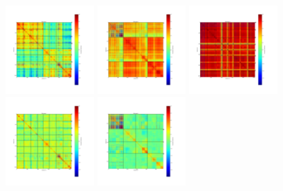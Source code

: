 \begin{figure}[ht] %
\begin{center}
\includegraphics[width=0.3\textwidth]{Figures/DarkTests/corrmat_TOI_array_1_20161211s299.pdf}
\includegraphics[width=0.3\textwidth]{Figures/DarkTests/corrmat_TOI_array_2_20161211s299.pdf}
\includegraphics[width=0.3\textwidth]{Figures/DarkTests/corrmat_TOI_array_3_20161211s299.pdf}
\includegraphics[width=0.3\textwidth]{Figures/DarkTests/corrmat_TOI_CM_array_1_20161211s299.pdf}
\includegraphics[width=0.3\textwidth]{Figures/DarkTests/corrmat_TOI_CM_array_2_20161211s299.pdf}

\end{center}
\end{figure}
